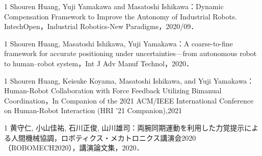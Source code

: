 \begin{著書}{1}
Shouren Huang, Yuji Yamakawa and Masatoshi Ishikawa：Dynamic Compensation Framework to Improve the Autonomy of Industrial Robots. IntechOpen，Industrial Robotics-New Paradigms，2020/09．

\end{著書}

\begin{雑誌論文}{1}
Shouren Huang, Masatoshi Ishikawa, Yuji Yamakawa：A coarse-to-fine framework for accurate positioning under uncertainties—from autonomous robot to human–robot system，Int J Adv Manuf Technol，2020．

\end{雑誌論文}

\begin{査読付}{1}
Shouren Huang, Keisuke Koyama, Masatoshi Ishikawa, and Yuji Yamakawa：Human-Robot Collaboration with Force Feedback Utilizing Bimanual Coordination，In Companion of the 2021 ACM/IEEE International Conference on Human-Robot Interaction (HRI ’21 Companion),2021

\end{査読付}

\begin{発表}{1}
黄守仁, 小山佳祐, 石川正俊, 山川雄司：両腕同期運動を利用した力覚提示による人間機械協調，ロボティクス・メカトロニクス講演会2020（ROBOMECH2020），講演論文集，2020．

\end{発表}
